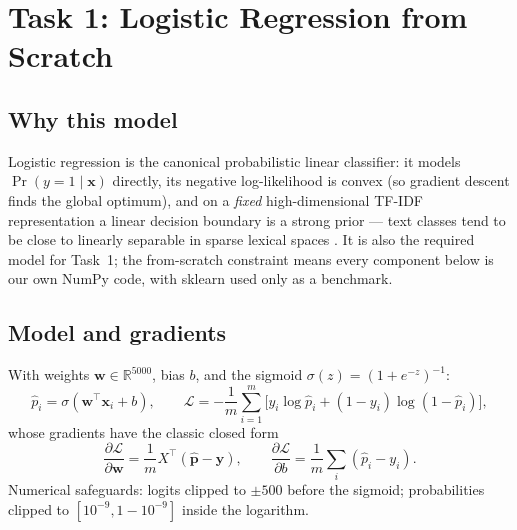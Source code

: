 \documentclass[11pt,a4paper]{article}
\newcommand{\sig}{\sigma}
\begin{document}
\section{Task 1: Logistic Regression from Scratch}\label{sec:task1}

\subsection{Why this model}
Logistic regression is the canonical probabilistic linear classifier: it models $\Pr(y{=}1 \mid \mathbf{x})$ directly, its negative log-likelihood is convex (so gradient descent finds the global optimum), and on a \emph{fixed} high-dimensional TF-IDF representation a linear decision boundary is a strong prior --- text classes tend to be close to linearly separable in sparse lexical spaces \cite{joachims1998}. It is also the required model for Task~1; the from-scratch constraint means every component below is our own NumPy code, with sklearn used only as a benchmark.

\subsection{Model and gradients}
With weights $\mathbf{w} \in \mathbb{R}^{5000}$, bias $b$, and the sigmoid $\sig(z) = (1+e^{-z})^{-1}$:
\begin{equation}
\hat{p}_i = \sig(\mathbf{w}^\top \mathbf{x}_i + b), \qquad
\mathcal{L} = -\frac{1}{m}\sum_{i=1}^{m}\Big[y_i \log \hat{p}_i + (1-y_i)\log(1-\hat{p}_i)\Big],
\end{equation}
whose gradients have the classic closed form
\begin{equation}
\frac{\partial \mathcal{L}}{\partial \mathbf{w}} = \frac{1}{m} X^\top(\hat{\mathbf{p}} - \mathbf{y}), \qquad
\frac{\partial \mathcal{L}}{\partial b} = \frac{1}{m}\sum_i (\hat{p}_i - y_i).
\end{equation}
Numerical safeguards: logits clipped to $\pm 500$ before the sigmoid; probabilities clipped to $[10^{-9}, 1-10^{-9}]$ inside the logarithm.
\end{document}
